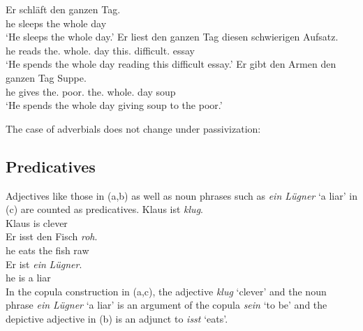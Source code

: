 \eal
\ex 
\gll Er schläft den ganzen Tag.\\
     he sleeps the whole day\\
\glt `He sleeps the whole day.'
\ex 
\gll Er liest den ganzen Tag diesen schwierigen Aufsatz.\\
	 he reads the.\acc{} whole.\acc{} day this.\acc{} difficult.\acc{} essay\\
\glt `He spends the whole day reading this difficult essay.'
\ex 
\gll Er gibt den Armen den ganzen Tag Suppe.\\
	 he gives the.\dat{} poor.\dat{} the.\acc{} whole.\acc{} day soup\\
\glt `He spends the whole day giving soup to the poor.'
\zl

The case of adverbials does not change under passivization:
\eal
{}
\zl
{}

\subsection{Predicatives}

Adjectives like those in (a,b) as well as noun phrases such as \emph{ein Lügner} `a liar' in (c)
are counted as predicatives. 
\eal
\ex 
\gll Klaus ist \emph{klug}.\\
	 Klaus is clever\\
\ex 
\gll Er isst den Fisch \emph{roh}.\\
	 he eats the fish raw\\
\ex 
\gll Er ist \emph{ein} \emph{Lügner}.\\
     he is a liar\\
\zl
In the copula construction in (a,c), the adjective \emph{klug} `clever' and the noun phrase
\emph{ein Lügner} `a liar' is an argument of the copula \emph{sein} `to be' and the depictive adjective in (b)
is an adjunct to \emph{isst} `eats'.

